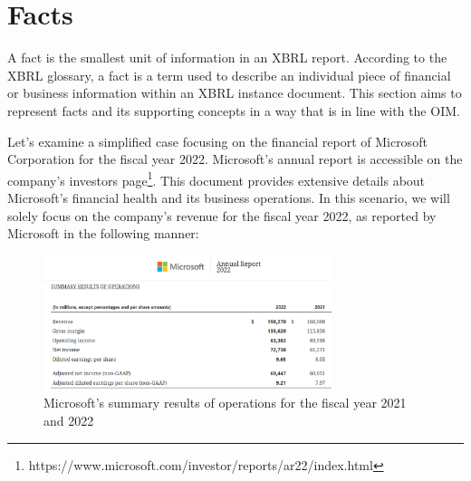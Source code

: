 \section{Facts}
\label{sec:facts}

A fact is the smallest unit of information in an XBRL report. 
According to the XBRL glossary, a fact is a term used to describe an individual piece of financial or business information within an XBRL instance document\cite{xbrl_glossary}.
This section aims to represent facts and its supporting concepts in a way that is in line with the OIM.

Let's examine a simplified case focusing on the financial report of Microsoft Corporation for the fiscal year 2022.
Microsoft's annual report is accessible on the company's investors page\footnote{https://www.microsoft.com/investor/reports/ar22/index.html}.
This document provides extensive details about Microsoft's financial health and its business operations.
In this scenario, we will solely focus on the company's revenue for the fiscal year 2022,
as reported by Microsoft in the following manner:

\begin{figure}[H]
    \centering
    \includegraphics[width=0.75\textwidth]{images/microsoft_annual_report_2022.png}
\caption{Microsoft's summary results of operations for the fiscal year 2021 and 2022\cite{microsoft2022ar}}
    \label{fig:microsoft_annual_report_2022}
\end{figure}

